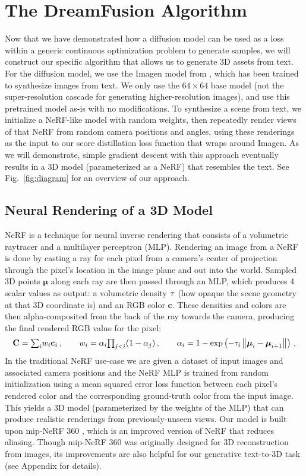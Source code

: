 \documentclass{article} %
\newcommand{\dreamfusion}{DreamFusion\xspace}
\newcommand{\npos}[0]{\boldsymbol{\mu}}
\begin{document}
\section{The \dreamfusion Algorithm}

Now that we have demonstrated how a diffusion model can be used as a loss within a generic continuous optimization problem to generate samples, we will construct our specific algorithm that allows us to generate 3D assets from text. For the diffusion model, we use the Imagen  model from \citet{imagen}, which has been trained to synthesize images from text. We only use the $64\times64$ base model (not the super-resolution cascade for generating higher-resolution images), and use this pretrained model as-is with no modifications. To synthesize a scene from text, we initialize a NeRF-like model with random weights, then repeatedly render views of that NeRF from random camera positions and angles, using these renderings as the input to our score distillation loss function that wraps around Imagen. As we will demonstrate, simple gradient descent with this approach eventually results in a 3D model (parameterized as a NeRF) that resembles the text. See Fig.~\ref{fig:diagram} for an overview of our approach.%


\subsection{Neural Rendering of a 3D Model}
\label{sec:nerf}
NeRF is a technique for neural inverse rendering that consists of a volumetric raytracer and a multilayer perceptron (MLP). Rendering an image from a NeRF is done by casting a ray for each pixel from a camera's center of projection through the pixel's location in the image plane and out into the world. Sampled 3D points $\npos$ along each ray are then passed through an MLP, which produces 4 scalar values as output: a volumetric density $\tau$ (how opaque the scene geometry at that 3D coordinate is) and an RGB color $\boldsymbol c$. These densities and colors are then alpha-composited from the back of the ray towards the camera, producing the final rendered RGB value for the pixel:
\begin{gather}
\Col = {\textstyle \sum_{i}} w_i \col_i \,, \quad \quad w_i = \alpha_i {\textstyle\prod_{j < i}}(1-\alpha_j) \,, \quad\quad
\alpha_i = 1-\exp\left( {-\density_i \norm{\npos_i - \npos_{i+1}} } \right) \,,
\label{eq:volrend}
\end{gather}
In the traditional NeRF use-case we are given a dataset of input images and associated camera positions and the NeRF MLP is trained from random initialization using a mean squared error loss function between each pixel's rendered color and the corresponding ground-truth color from the input image. 
This yields a 3D model (parameterized by the weights of the MLP) that can produce realistic renderings from previously-unseen views. 
Our model is built upon mip-NeRF 360 \citep{Barron2021MipNeRF3U}, which is an improved version of NeRF that reduces aliasing. Though mip-NeRF 360 was originally designed for 3D reconstruction from images,  its improvements are also helpful for our generative text-to-3D task (see Appendix for details).
\end{document}
